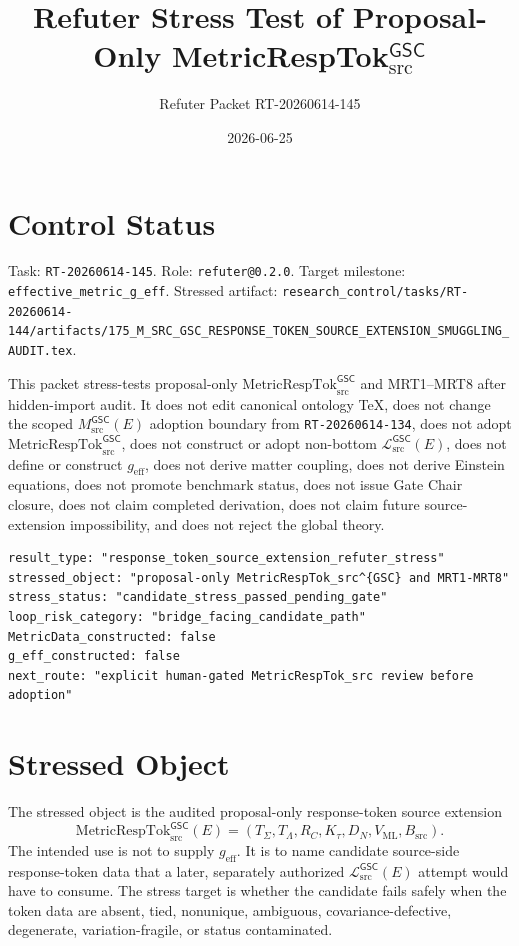 \documentclass[11pt]{article}
\title{Refuter Stress Test of Proposal-Only MetricRespTok\(_{\mathrm{src}}^{\mathsf{GSC}}\)}
\author{Refuter Packet RT-20260614-145}
\date{2026-06-25}
\newcommand{\MsrcGSC}{M_{\mathrm{src}}^{\mathsf{GSC}}}
\newcommand{\MetricRespTok}{\mathrm{MetricRespTok}_{\mathrm{src}}^{\mathsf{GSC}}}
\newcommand{\MetricData}{\mathcal{L}_{\mathrm{src}}^{\mathsf{GSC}}}
\newcommand{\geff}{g_{\mathrm{eff}}}
\begin{document}
\maketitle

\section{Control Status}

Task: \texttt{RT-20260614-145}. Role: \texttt{refuter@0.2.0}. Target
milestone: \texttt{effective\_metric\_g\_eff}. Stressed artifact:
\texttt{research\_control/tasks/RT-20260614-144/artifacts/175\_M\_SRC\_GSC\_RESPONSE\_TOKEN\_SOURCE\_EXTENSION\_SMUGGLING\_AUDIT.tex}.

This packet stress-tests proposal-only \(\MetricRespTok\) and MRT1--MRT8 after
hidden-import audit. It does not edit canonical ontology TeX, does not change
the scoped \(\MsrcGSC(E)\) adoption boundary from \texttt{RT-20260614-134},
does not adopt \(\MetricRespTok\), does not construct or adopt non-bottom
\(\MetricData(E)\), does not define or construct \(\geff\), does not derive
matter coupling, does not derive Einstein equations, does not promote
benchmark status, does not issue Gate Chair closure, does not claim completed
derivation, does not claim future source-extension impossibility, and does
not reject the global theory.

\begin{verbatim}
result_type: "response_token_source_extension_refuter_stress"
stressed_object: "proposal-only MetricRespTok_src^{GSC} and MRT1-MRT8"
stress_status: "candidate_stress_passed_pending_gate"
loop_risk_category: "bridge_facing_candidate_path"
MetricData_constructed: false
g_eff_constructed: false
next_route: "explicit human-gated MetricRespTok_src review before adoption"
\end{verbatim}

\section{Stressed Object}

The stressed object is the audited proposal-only response-token source
extension
\[
  \MetricRespTok(E)
  =
  (
    T_{\Sigma},
    T_{\Lambda},
    R_C,
    K_{\tau},
    D_N,
    V_{\mathrm{ML}},
    B_{\mathrm{src}}
  ).
\]
The intended use is not to supply \(\geff\). It is to name candidate
source-side response-token data that a later, separately authorized
\(\MetricData(E)\) attempt would have to consume. The stress target is whether
the candidate fails safely when the token data are absent, tied, nonunique,
ambiguous, covariance-defective, degenerate, variation-fragile, or status
contaminated.
\end{document}
